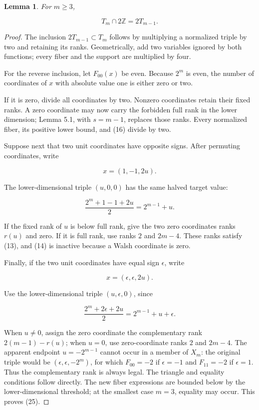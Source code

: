 \documentclass[11pt]{article}
\newtheorem{lemma}[theorem]{Lemma}
\theoremstyle{remark}
\begin{document}
\begin{lemma}

For $m\ge 3$,

\[
T_m\cap2\mathbb Z=2T_{m-1}.
\tag{25}
\]

\end{lemma}
\begin{proof}

The inclusion $2T_{m-1} \subset T_m$ follows by multiplying a normalized triple by two and retaining its ranks. Geometrically, add two variables ignored by both functions; every fiber and the support are multiplied by four.

For the reverse inclusion, let $F_{00}(x)$ be even. Because $2^m$ is even, the number of coordinates of $x$ with absolute value one is either zero or two.

If it is zero, divide all coordinates by two. Nonzero coordinates retain their fixed ranks. A zero coordinate may now carry the forbidden full rank in the lower dimension; Lemma 5.1, with $s=m-1$, replaces those ranks. Every normalized fiber, its positive lower bound, and (16) divide by two.

Suppose next that two unit coordinates have opposite signs. After permuting coordinates, write

\[
x=(1,-1,2u).
\]

The lower-dimensional triple $(u,0,0)$ has the same halved target value:

\[
\frac{2^m+1-1+2u}{2}=2^{m-1}+u.
\]

If the fixed rank of $u$ is below full rank, give the two zero coordinates ranks $r(u)$ and zero. If it is full rank, use ranks $2$ and $2m-4$. These ranks satisfy (13), and (14) is inactive because a Walsh coordinate is zero.

Finally, if the two unit coordinates have equal sign $\epsilon$, write

\[
x=(\epsilon,\epsilon,2u).
\]

Use the lower-dimensional triple $(u,\epsilon,0)$, since

\[
\frac{2^m+2\epsilon+2u}{2}
=2^{m-1}+u+\epsilon.
\]

When $u \ne 0$, assign the zero coordinate the complementary rank $2(m-1)-r(u)$; when $u=0$, use zero-coordinate ranks $2$ and $2m-4$. The apparent endpoint $u=-2^{m-1}$ cannot occur in a member of $X_m$: the original triple would be $(\epsilon,\epsilon,-2^m)$, for which $F_{00}=-2$ if $\epsilon=-1$ and $F_{11}=-2$ if $\epsilon=1$. Thus the complementary rank is always legal. The triangle and equality conditions follow directly. The new fiber expressions are bounded below by the lower-dimensional threshold; at the smallest case $m=3$, equality may occur. This proves (25).

\end{proof}
\end{document}
